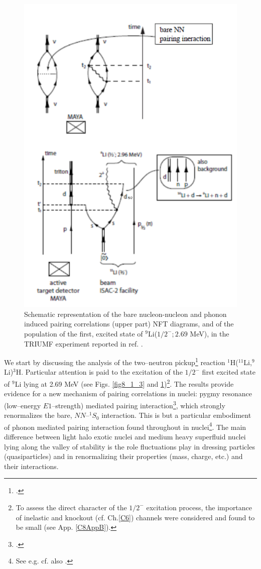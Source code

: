 \begin{figure}
 \centerline{\includegraphics*[width=15cm,angle=0]{C8/figsC8/fig8_1_1}}
 	\caption{Schematic representation of the bare nucleon-nucleon and phonon induced pairing correlations (upper part) NFT diagrams, and of the population of the first, excited state of $^{9}$Li($1/2^{-}; 2.69$ MeV), in the TRIUMF experiment  reported in ref. \cite{Tanihata:08}.}\label{fig8_1_1}
 \end{figure}
 We start by discussing  the analysis of the two--neutron pickup\footnote{\cite{Tanihata:08}.} reaction $^1$H($^{11}$Li,$^9$Li)$^3$H. Particular  attention is paid to the  excitation of the $1/2^-$ first excited state of $^9$Li lying at 2.69 MeV (see Figs. \ref{fig8_1_3} and \ref{fig8_1_1})\footnote{To assess the direct character of the $1/2^-$ excitation process, the importance of inelastic  and knockout (cf. Ch.\ref{C6}) channels were considered and found to be small (see App. \ref{C8AppB}).}. The results  provide evidence for a new mechanism of pairing correlations in nuclei: pygmy resonance (low--energy $E1$--strength) mediated pairing interaction\footnote{\citet{Barranco:01,Potel:10}.}, which strongly renormalizes the bare, $NN$--$^1S_0$ interaction. This is but a particular embodiment of phonon mediated pairing interaction found throughout in nuclei\footnote{See e.g. \citet{Barranco:99,Gori:04} cf. also \citet{Brink:05}.}. The main difference between light halo exotic nuclei and medium heavy superfluid nuclei lying along the valley of stability is the role fluctuations play in dressing particles (quasiparticles) and in renormalizing their properties (mass, charge, etc.) and their interactions.
